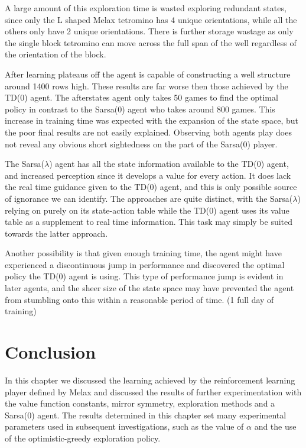 \documentclass{rucsthesis}
\begin{document}
A large amount of this exploration time is wasted exploring redundant states, since only the L shaped Melax tetromino has 4 unique orientations, while all the others only have 2 unique orientations. There is further storage wastage as only the single block tetromino can move across the full span of the well regardless of the orientation of the block. 

After learning plateaus off the agent is capable of constructing a well structure around 1400 rows high. These results are far worse then those achieved by the TD(0) agent. The afterstates agent only takes 50 games to find the optimal policy in contrast to the Sarsa(0) agent who takes around 800 games. This increase in training time was expected with the expansion of the state space, but the poor final results are not easily explained. Observing both agents play does not reveal any obvious short sightedness on the part of the Sarsa(0) player.

The Sarsa($\lambda$) agent has all the state information available to the TD(0) agent, and increased perception since it develops a value for every action. It does lack the real time guidance given to the TD(0) agent, and this is only possible source of ignorance we can identify. The approaches are quite distinct, with the Sarsa($\lambda$) relying on purely on its state-action table while the TD(0) agent uses its value table as a supplement to real time information. This task may simply be suited towards the latter approach.

Another possibility is that given enough training time, the agent might have experienced a discontinuous jump in performance and discovered the optimal policy the TD(0) agent is using. This type of performance jump is evident in later agents, and the sheer size of the state space may have prevented the agent from stumbling onto this within a reasonable period of time. (1 full day of training)

\section{Conclusion}

In this chapter we discussed the learning achieved by the reinforcement learning player defined by Melax and discussed the results of further experimentation with the value function constants, mirror symmetry, exploration methods and a Sarsa(0) agent. The results determined in this chapter set many experimental parameters used in subsequent investigations, such as the value of $\alpha$ and the use of the optimistic-greedy exploration policy.
\end{document}
